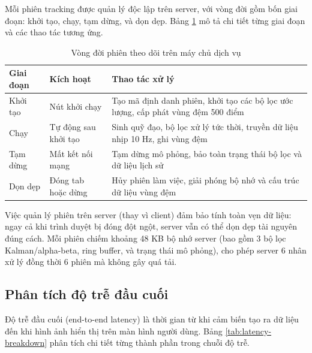 \hspace{0.5cm} Mỗi phiên tracking được quản lý độc lập trên server, với vòng đời gồm bốn giai đoạn: khởi tạo, chạy, tạm dừng, và dọn dẹp. Bảng \ref{tab:server-session-lifecycle} mô tả chi tiết từng giai đoạn và các thao tác tương ứng.



\begin{table}[H]
\centering
\caption{Vòng đời phiên theo dõi trên máy chủ dịch vụ}
\label{tab:server-session-lifecycle}
\begin{tabularx}{\linewidth}{llX}
\toprule
\textbf{Giai đoạn} & \textbf{Kích hoạt} & \textbf{Thao tác xử lý} \\
\midrule
Khởi tạo & Nút khởi chạy & Tạo mã định danh phiên, khởi tạo các bộ lọc ước lượng, cấp phát vùng đệm 500 điểm \\
Chạy & Tự động sau khởi tạo & Sinh quỹ đạo, bộ lọc xử lý tức thời, truyền dữ liệu nhịp 10 Hz, ghi vùng đệm \\
Tạm dừng & Mất kết nối mạng & Tạm dừng mô phỏng, bảo toàn trạng thái bộ lọc và dữ liệu lịch sử \\
Dọn dẹp & Đóng tab hoặc dừng & Hủy phiên làm việc, giải phóng bộ nhớ và cấu trúc dữ liệu vùng đệm \\
\bottomrule
\end{tabularx}
\end{table}

Việc quản lý phiên trên server (thay vì client) đảm bảo tính toàn vẹn dữ liệu: ngay cả khi trình duyệt bị đóng đột ngột, server vẫn có thể dọn dẹp tài nguyên đúng cách. Mỗi phiên chiếm khoảng 48 KB bộ nhớ server (bao gồm 3 bộ lọc Kalman/alpha-beta, ring buffer, và trạng thái mô phỏng), cho phép server 6 nhân xử lý đồng thời 6 phiên mà không gây quá tải.

\subsection{Phân tích độ trễ đầu cuối}

\hspace{0.5cm} Độ trễ đầu cuối (end-to-end latency) là thời gian từ khi cảm biến tạo ra dữ liệu đến khi hình ảnh hiển thị trên màn hình người dùng. Bảng \ref{tab:latency-breakdown} phân tích chi tiết từng thành phần trong chuỗi độ trễ.

